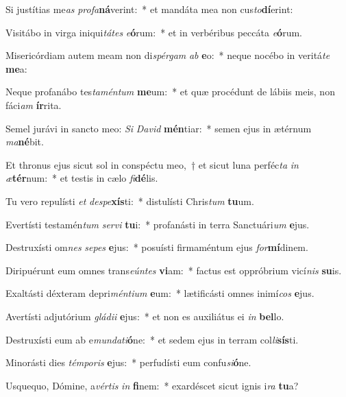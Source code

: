 \item Si justítias me\textit{as} \textit{pro}\textit{fa}\textbf{ná}verint:~* et mandáta mea non cus\textit{to}\textbf{dí}erint:
\item Visitábo in virga iniqui\textit{tá}\textit{tes} \textit{e}\textbf{ó}rum:~* et in verbéribus peccáta \textit{e}\textbf{ó}rum.
\item Misericórdiam autem meam non di\textit{spér}\textit{gam} \textit{ab} \textbf{e}o:~* neque nocébo in veritá\textit{te} \textbf{me}a:
\item Neque profanábo tes\textit{ta}\textit{mén}\textit{tum} \textbf{me}um:~* et quæ procédunt de lábiis meis, non fáci\textit{am} \textbf{ír}rita.
\item Semel jurávi in sancto meo: \textit{Si} \textit{Da}\textit{vid} \textbf{mén}tiar:~* semen ejus in ætérnum \textit{ma}\textbf{né}bit.
\item Et thronus ejus sicut sol in conspéctu meo,~† et sicut luna perféc\textit{ta} \textit{in} \textit{æ}\textbf{tér}num:~* et testis in cælo \textit{fi}\textbf{dé}lis.
\item Tu vero repulísti \textit{et} \textit{de}\textit{spe}\textbf{xís}ti:~* distulísti Chris\textit{tum} \textbf{tu}um.
\item Evertísti testamén\textit{tum} \textit{ser}\textit{vi} \textbf{tu}i:~* profanásti in terra Sanctuári\textit{um} \textbf{e}jus.
\item Destruxísti om\textit{nes} \textit{se}\textit{pes} \textbf{e}jus:~* posuísti firmaméntum ejus \textit{for}\textbf{mí}dinem.
\item Diripuérunt eum omnes trans\textit{e}\textit{ún}\textit{tes} \textbf{vi}am:~* factus est oppróbrium vicí\textit{nis} \textbf{su}is.
\item Exaltásti déxteram depri\textit{mén}\textit{ti}\textit{um} \textbf{e}um:~* lætificásti omnes inimí\textit{cos} \textbf{e}jus.
\item Avertísti adjutórium \textit{glá}\textit{di}\textit{i} \textbf{e}jus:~* et non es auxiliátus ei \textit{in} \textbf{bel}lo.
\item Destruxísti eum ab e\textit{mun}\textit{da}\textit{ti}\textbf{ó}ne:~* et sedem ejus in terram col\textit{li}\textbf{sís}ti.
\item Minorásti dies \textit{tém}\textit{po}\textit{ris} \textbf{e}jus:~* perfudísti eum confu\textit{si}\textbf{ó}ne.
\item Usquequo, Dómine, a\textit{vér}\textit{tis} \textit{in} \textbf{fi}nem:~* exardéscet sicut ignis i\textit{ra} \textbf{tu}a?
